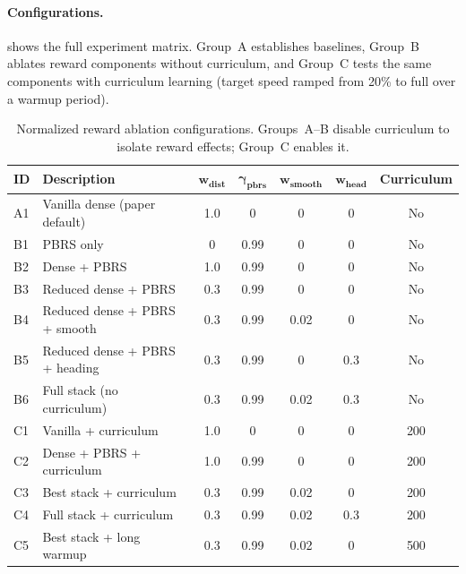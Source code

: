 \documentclass[11pt]{article}
\begin{document}
\paragraph{Configurations.}
 shows the full experiment matrix.
Group~A establishes baselines, Group~B ablates reward components without curriculum, and Group~C tests the same components with curriculum learning (target speed ramped from 20\% to full over a warmup period).

\begin{table}[H]
  \centering
  \small
  \renewcommand{\arraystretch}{1.3}
  \caption{Normalized reward ablation configurations. Groups~A--B disable curriculum to isolate reward effects; Group~C enables it.}
  \label{tab:ablation-v2-configs}
  \begin{tabular}{@{}llccccc@{}}
    \toprule
    \textbf{ID} & \textbf{Description} & $\boldsymbol{w_{\textbf{dist}}}$ & $\boldsymbol{\gamma_{\textbf{pbrs}}}$ & $\boldsymbol{w_{\textbf{smooth}}}$ & $\boldsymbol{w_{\textbf{head}}}$ & \textbf{Curriculum} \\
    \midrule
    A1 & Vanilla dense (paper default)    & 1.0 & 0    & 0    & 0   & No  \\
    \midrule
    B1 & PBRS only                        & 0   & 0.99 & 0    & 0   & No  \\
    B2 & Dense + PBRS                     & 1.0 & 0.99 & 0    & 0   & No  \\
    B3 & Reduced dense + PBRS             & 0.3 & 0.99 & 0    & 0   & No  \\
    B4 & Reduced dense + PBRS + smooth    & 0.3 & 0.99 & 0.02 & 0   & No  \\
    B5 & Reduced dense + PBRS + heading   & 0.3 & 0.99 & 0    & 0.3 & No  \\
    B6 & Full stack (no curriculum)        & 0.3 & 0.99 & 0.02 & 0.3 & No  \\
    \midrule
    C1 & Vanilla + curriculum              & 1.0 & 0    & 0    & 0   & 200 \\
    C2 & Dense + PBRS + curriculum         & 1.0 & 0.99 & 0    & 0   & 200 \\
    C3 & Best stack + curriculum           & 0.3 & 0.99 & 0.02 & 0   & 200 \\
    C4 & Full stack + curriculum           & 0.3 & 0.99 & 0.02 & 0.3 & 200 \\
    C5 & Best stack + long warmup          & 0.3 & 0.99 & 0.02 & 0   & 500 \\
    \bottomrule
  \end{tabular}
\end{table}
\end{document}
